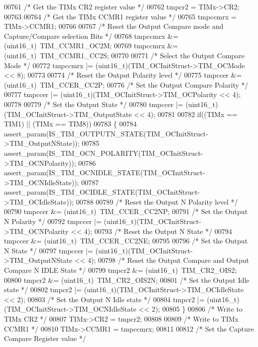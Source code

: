 \begin{DoxyCode}
00761   \textcolor{comment}{/* Get the TIMx CR2 register value */}
00762   tmpcr2 =  TIMx->CR2;
00763 
00764   \textcolor{comment}{/* Get the TIMx CCMR1 register value */}
00765   tmpccmrx = TIMx->CCMR1;
00766 
00767   \textcolor{comment}{/* Reset the Output Compare mode and Capture/Compare selection Bits */}
00768   tmpccmrx &= (uint16\_t)~TIM_CCMR1_OC2M;
00769   tmpccmrx &= (uint16\_t)~TIM_CCMR1_CC2S;
00770 
00771   \textcolor{comment}{/* Select the Output Compare Mode */}
00772   tmpccmrx |= (uint16\_t)(TIM\_OCInitStruct->TIM_OCMode << 8);
00773 
00774   \textcolor{comment}{/* Reset the Output Polarity level */}
00775   tmpccer &= (uint16\_t)~TIM_CCER_CC2P;
00776   \textcolor{comment}{/* Set the Output Compare Polarity */}
00777   tmpccer |= (uint16\_t)(TIM\_OCInitStruct->TIM_OCPolarity << 4);
00778 
00779   \textcolor{comment}{/* Set the Output State */}
00780   tmpccer |= (uint16\_t)(TIM\_OCInitStruct->TIM_OutputState << 4);
00781 
00782   \textcolor{keywordflow}{if}((TIMx == TIM1) || (TIMx == TIM8))
00783   \{
00784     assert_param(IS\_TIM\_OUTPUTN\_STATE(TIM\_OCInitStruct->TIM\_OutputNState));
00785     assert_param(IS\_TIM\_OCN\_POLARITY(TIM\_OCInitStruct->TIM\_OCNPolarity));
00786     assert_param(IS\_TIM\_OCNIDLE\_STATE(TIM\_OCInitStruct->TIM\_OCNIdleState));
00787     assert_param(IS\_TIM\_OCIDLE\_STATE(TIM\_OCInitStruct->TIM\_OCIdleState));
00788 
00789     \textcolor{comment}{/* Reset the Output N Polarity level */}
00790     tmpccer &= (uint16\_t)~TIM_CCER_CC2NP;
00791     \textcolor{comment}{/* Set the Output N Polarity */}
00792     tmpccer |= (uint16\_t)(TIM\_OCInitStruct->TIM_OCNPolarity << 4);
00793     \textcolor{comment}{/* Reset the Output N State */}
00794     tmpccer &= (uint16\_t)~TIM_CCER_CC2NE;
00795 
00796     \textcolor{comment}{/* Set the Output N State */}
00797     tmpccer |= (uint16\_t)(TIM\_OCInitStruct->TIM_OutputNState << 4);
00798     \textcolor{comment}{/* Reset the Output Compare and Output Compare N IDLE State */}
00799     tmpcr2 &= (uint16\_t)~TIM_CR2_OIS2;
00800     tmpcr2 &= (uint16\_t)~TIM_CR2_OIS2N;
00801     \textcolor{comment}{/* Set the Output Idle state */}
00802     tmpcr2 |= (uint16\_t)(TIM\_OCInitStruct->TIM_OCIdleState << 2);
00803     \textcolor{comment}{/* Set the Output N Idle state */}
00804     tmpcr2 |= (uint16\_t)(TIM\_OCInitStruct->TIM_OCNIdleState << 2);
00805   \}
00806   \textcolor{comment}{/* Write to TIMx CR2 */}
00807   TIMx->CR2 = tmpcr2;
00808 
00809   \textcolor{comment}{/* Write to TIMx CCMR1 */}
00810   TIMx->CCMR1 = tmpccmrx;
00811 
00812   \textcolor{comment}{/* Set the Capture Compare Register value */}

\end{DoxyCode}

